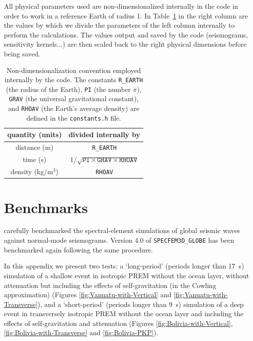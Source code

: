 \documentclass[oneside,english]{book}
\providecommand{\tabularnewline}{\\}
\begin{document}
All physical parameters used are non-dimensionalized internally in the code
in order to work in a reference Earth of radius 1. In Table~{\small \ref{table:conventions} in the right column are the values by which
we divide the parameters of the left column internally to perform the calculations.
The values output and saved by the code (seismograms, sensitivity kernels...) are then
scaled back to the right physical dimensions before being saved.
}%
\begin{table}[ht]
\noindent \begin{centering}
{\small }\begin{tabular}{|c|c|}
\hline
quantity (units)  & divided internally by \tabularnewline
\hline
distance (m)  & \texttt{R\_EARTH} \tabularnewline
time (s)  & $1/\sqrt{\texttt{PI}\times\texttt{GRAV}\times\texttt{RHOAV}}$ \tabularnewline
density (kg/m$^{3}$)  & \texttt{RHOAV} \tabularnewline
\hline
\end{tabular}
\par\end{centering}{\small \par}

\caption{Non-dimensionalization convention employed internally by the code. The constants \texttt{R\_EARTH}
(the radius of the Earth), \texttt{PI} (the number $\pi$), \texttt{GRAV}
(the universal gravitational constant), and \texttt{RHOAV} (the Earth's
average density) are defined in the \texttt{constants.h} file. }


{\small \label{table:conventions} }
\end{table}
{\small \par}


\chapter{Benchmarks}

\citet{KoTr02a,KoTr02b} carefully benchmarked the spectral-element
simulations of global seismic waves against normal-mode seismograms.
Version 4.0 of \texttt{SPECFEM3D\_GLOBE} has been benchmarked again
following the same procedure.

In this appendix we present two tests: a `long-period' (periods longer
than 17~s) simulation of a shallow event in isotropic PREM \citep{DzAn81}
without the ocean layer, without attenuation but including the effects
of self-gravitation (in the Cowling approximation) (Figures \ref{fig:Vanuatu-with-Vertical}
and \ref{fig:Vanuatu-with-Transverse}), and a `short-period' (periods
longer than 9~s) simulation of a deep event in transversely isotropic
PREM without the ocean layer and including the effects of self-gravitation
and attenuation (Figures \ref{fig:Bolivia-with-Vertical}, \ref{fig:Bolivia-with-Transverse}
and \ref{fig:Bolivia-PKP}).
\end{document}

